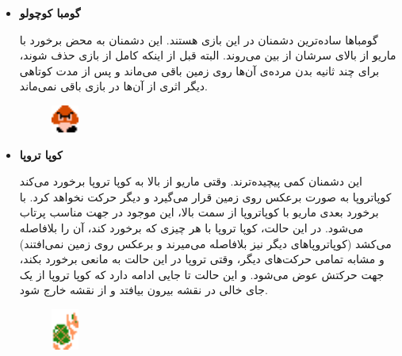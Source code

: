 \documentclass{utap}
\begin{document}
	\begin{itemize}
	
		\item

\textbf{گومبا کوچولو} \\
			\begin{minipage}{.75\textwidth}
گومباها ساده‌ترین دشمنان در این بازی هستند. این دشمنان به محض برخورد با ماریو از بالای سرشان از بین می‌روند. البته قبل از اینکه کامل از بازی حذف شوند، برای چند ثانیه بدن مرده‌ی آن‌ها روی زمین باقی می‌ماند و پس از مدت کوتاهی دیگر اثری از آن‌ها در بازی باقی نمی‌ماند.
\end{minipage}
\begin{minipage}{.15\textwidth}
\begin{figure}[H]
	\begin{center}
		\includegraphics[width=0.9cm]{goomba}
	\end{center}
\end{figure}
\end{minipage}


		\item
\textbf{کوپا تروپا}
\\
			\begin{minipage}{.75\textwidth}
این دشمنان کمی پیچیده‌ترند. وقتی ماریو از بالا به کوپا تروپا برخورد می‌کند کوپاتروپا به صورت برعکس روی زمین قرار می‌گیرد و دیگر حرکت نخواهد کرد. با برخورد بعدی ماریو با کوپا‌تروپا از سمت بالا، این موجود در جهت مناسب پرتاب می‌شود. در این حالت، کوپا تروپا با هر چیزی که برخورد کند، آن را بلافاصله می‌کشد (کوپاتروپاهای دیگر نیز بلافاصله می‌میرند و برعکس روی زمین نمی‌افتند) و مشابه تمامی حرکت‌های دیگر، وقتی تروپا در این حالت به مانعی برخورد بکند، جهت حرکتش عوض می‌شود. و این حالت تا جایی ادامه دارد که کوپا تروپا از یک جای خالی در نقشه بیرون بیافتد و از نقشه خارج شود.
\end{minipage}
\begin{minipage}{.15\textwidth}
\begin{figure}[H]
	\begin{center}
		\includegraphics[width=0.9cm]{koopa}
	\end{center}
\end{figure}
\end{minipage}

	\end{itemize}
\end{document}
